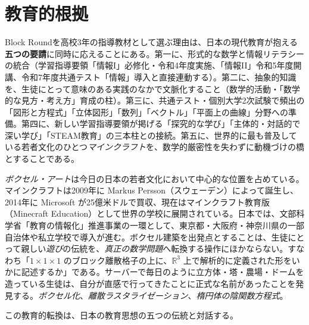 \documentclass[12pt,a4paper]{scrartcl}
\newcommand{\acc}[1]{\textcolor{accent}{\textbf{#1}}}
\begin{document}
\section{教育的根拠}\label{sec:justificativa}

Block Roundを高校3年の指導教材として選ぶ理由は、日本の現代教育が抱える\acc{五つの要請}に同時に応えることにある。第一に、形式的な数学と情報リテラシーの統合（学習指導要領「情報I」必修化・令和4年度実施、「情報II」令和5年度開講、令和7年度共通テスト「情報」導入と直接連動する）。第二に、抽象的知識を、生徒にとって意味のある実践のなかで文脈化すること（数学的活動・「数学的な見方・考え方」育成の柱）。第三に、共通テスト・個別大学2次試験で頻出の「図形と方程式」「立体図形」「数列」「ベクトル」「平面上の曲線」分野への準備。第四に、新しい学習指導要領が掲げる「探究的な学び」「主体的・対話的で深い学び」「STEAM教育」の三本柱との接続。第五に、世界的に最も普及している若者文化のひとつ\emph{マインクラフト}を、数学的厳密性を失わずに動機づけの橋とすることである。

\emph{ボクセル・アート}は今日の日本の若者文化において中心的な位置を占めている。マインクラフトは2009年に Markus Persson（スウェーデン）によって誕生し、2014年に Microsoft が25億米ドルで買収、現在はマインクラフト教育版（Minecraft Education）として世界の学校に展開されている。日本では、文部科学省「教育の情報化」推進事業の一環として、東京都・大阪府・神奈川県の一部自治体や私立学校で導入が進む。ボクセル建築を出発点とすることは、生徒にとって親しい\emph{遊び}の伝統を、\emph{真正の数学問題}へ転換する操作にほかならない。すなわち「$1\times1\times1$ のブロック離散格子の上に、$\mathbb{R}^3$ 上で解析的に定義された形をいかに記述するか」である。サーバーで毎日のように立方体・塔・農場・ドームを造っている生徒は、自分が直感で行ってきたことに正式な名前があったことを発見する。\emph{ボクセル化}、\emph{離散ラスタライゼーション}、\emph{楕円体の陰関数方程式}。

この教育的転換は、日本の教育思想の五つの伝統と対話する。
\end{document}
